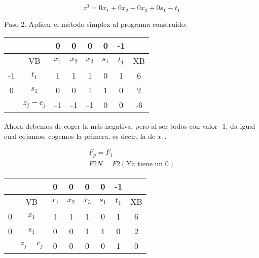 \begin{itemize}
    \begin{equation*}
        z^0=0x_1 + 0x_2 + 0x_3 + 0s_1 -t_1
    \end{equation*}

    Paso 2. Aplicar el método simplex al programa construido:

    \begin{table}[H]
    \centering
    \begin{tabular}{|c|c|c|c|c|c|c|c|}
    \hline
    &  & 0 & 0 & 0 & 0 & -1 &\\
    \hline
    & VB & $x_1$ & $x_2$ & $x_3$ & $s_1$ & $t_1$ & XB \\
    \hline
    -1 & $t_1$ & 1 & 1 & 1 & 0 & 1 & 6\\
    \hline
    0 & $s_1$ & 0 & 0 & 1 & 1& 0 &2\\
    \hline
    & $z_j - c_j$ & -1 & -1 & -1 & 0 & 0 &-6\\
    \hline
    \end{tabular}
    \end{table}

    Ahora debemos de coger la más negativa, pero al ser todos con valor -1, da igual cual cojamos, cogemos la primera, es decir, la de $x_1$.

        \begin{align*}
            F_p = F_1\\
            F2N = F2 (\text{Ya tiene un 0})
        \end{align*}
        

    \begin{table}[H]
        \centering
        \begin{tabular}{|c|c|c|c|c|c|c|c|}
        \hline
        &  & 0 & 0 & 0 & 0 & -1 &\\
        \hline
        & VB & $x_1$ & $x_2$ & $x_3$ & $s_1$ & $t_1$ & XB \\
        \hline
        0 & $x_1$ & 1 & 1 & 1 & 0 & 1 & 6\\
        \hline
        0 & $s_1$ & 0 & 0 & 1 & 1& 0 &2\\
        \hline
        & $z_j - c_j$ & 0 & 0& 0 & 0 & 1 &0\\
        \hline
        \end{tabular}
    \end{table}


\end{itemize}
